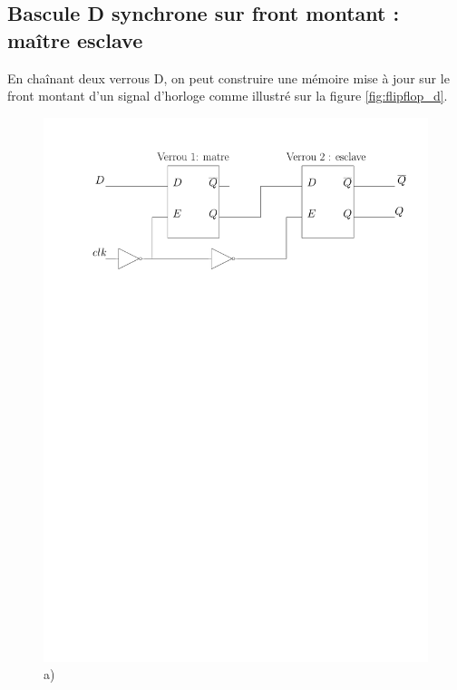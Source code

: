 \subsection{Bascule D synchrone sur front montant : maître esclave}

En chaînant deux verrous D, on peut construire une mémoire mise à jour sur le front montant d'un signal d'horloge comme illustré sur la figure \ref{fig:flipflop_d}.

\begin{figure}[htbp]
   \begin{minipage}[c]{.7\linewidth}
\includegraphics[width=\columnwidth]{Figs/flipflop_D.pdf}\\\centering a)
\end{minipage}\hfill
\begin{minipage}[c]{.2\linewidth}

\end{minipage}
\end{figure}
